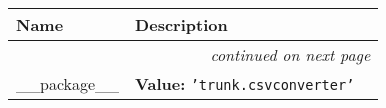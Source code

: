    \vspace{-1cm}
\hspace{\varindent}\begin{longtable}{|p{\varnamewidth}|p{\vardescrwidth}|l}
\cline{1-2}
\cline{1-2} \centering \textbf{Name} & \centering \textbf{Description}& \\
\cline{1-2}
\endhead\cline{1-2}\multicolumn{3}{r}{\small\textit{continued on next page}}\\\endfoot\cline{1-2}
\endlastfoot\raggedright \_\-\_\-p\-a\-c\-k\-a\-g\-e\-\_\-\_\- & \raggedright \textbf{Value:} 
{\tt \texttt{'}\texttt{trunk.csvconverter}\texttt{'}}&\\
\cline{1-2}
\end{longtable}

